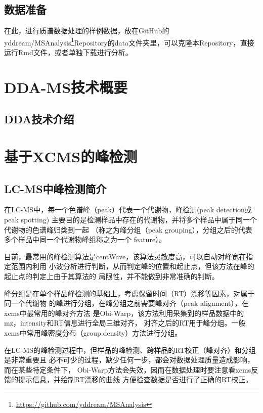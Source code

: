 \documentclass[]{ctexbook}
\renewcommand{\href}[2]{#2\footnote{\url{#1}}}
\begin{document}
\section{数据准备}

在此，进行质谱数据处理的样例数据，放在GitHub的\href{https://github.com/yddream/MSAnalysis}{yddream/MSAnalysis}Repository的data文件夹里，可以克隆本Repository，直接运行Rmd文件，或者单独下载进行分析。

\mainmatter

\hypertarget{chapDDA}{%
\chapter{DDA-MS技术概要}\label{chapDDA}}

\hypertarget{dda}{%
\section{DDA技术介绍}\label{dda}}

\hypertarget{chapPD}{%
\chapter{基于XCMS的峰检测}\label{chapPD}}

\hypertarget{lc-ms}{%
\section{LC-MS中峰检测简介}\label{lc-ms}}

在LC-MS中，每一个色谱峰（peak）代表一个代谢物，峰检测(peak detection或peak spotting)
主要目的是检测样品中存在的代谢物，并将多个样品中属于同一个代谢物的色谱峰归类到一起
（称之为峰分组（peak grouping），分组之后的代表多个样品中同一个代谢物峰组称之为一个
feature）。

目前，最常用的峰检测算法是centWave，该算法灵敏度高，可以自动对峰宽在指定范围内利用
小波分析进行判断，从而判定峰的位置和起止点，但该方法在峰的起止点的判定上由于其算法的
局限性，并不能做到非常准确的判断。

峰分组是在单个样品峰检测的基础上，考虑保留时间（RT）漂移等因素，对属于同一个代谢物
的峰进行分组，在峰分组之前需要峰对齐（peak alignment），在xcms中最常用的峰对齐方法
是Obi-Warp，该方法利用采集到的样品数据中的mz，intensity和RT信息进行全局三维对齐，
对齐之后的RT用于峰分组。一般xcms中常用峰密度分布（group.density）方法进行分组。

在LC-MS的峰检测过程中，但样品的峰检测、跨样品的RT校正（峰对齐）和分组是非常重要且
必不可少的过程，缺少任何一步，都会对数据处理质量造成影响，而在某些特定条件下，
Obi-Warp方法会失效，因而在数据处理时要注意看xcms反馈的提示信息，并绘制RT漂移的曲线
方便检查数据是否进行了正确的RT校正。
\end{document}
